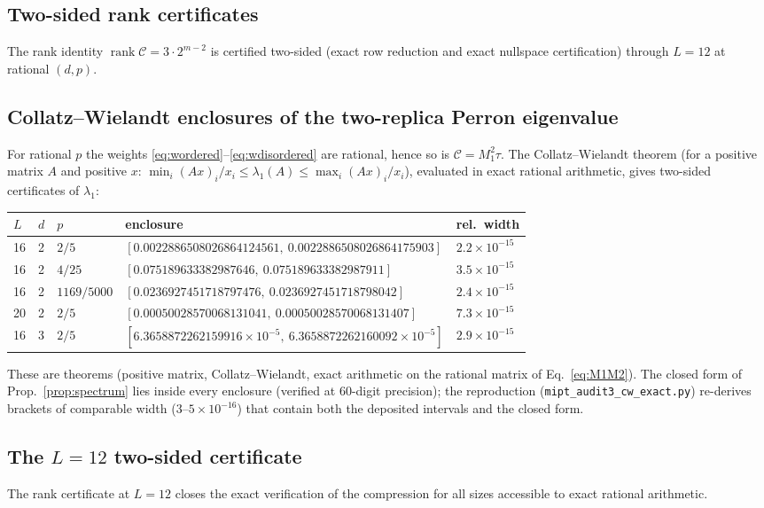 \documentclass[11pt]{article}
\newcommand{\Ccomp}{\mathcal{C}}
\begin{document}
\subsection{Two-sided rank certificates}
\label{app:certificates}
The rank identity $\operatorname{rank}\Ccomp=3\cdot2^{m-2}$ is certified
two-sided (exact row reduction and exact nullspace certification) through
$L=12$ at rational $(d,p)$.

\subsection{Collatz--Wielandt enclosures of the two-replica Perron
eigenvalue}\label{app:enclosures}
For rational $p$ the weights \eqref{eq:wordered}--\eqref{eq:wdisordered} are
rational, hence so is $\Ccomp=M_1^2\tau$.  The Collatz--Wielandt theorem
(for a positive matrix $A$ and positive $x$:
$\min_i(Ax)_i/x_i\le\lambda_1(A)\le\max_i(Ax)_i/x_i$), evaluated in exact
rational arithmetic, gives two-sided certificates of $\lambda_1$:
\begin{center}
\begin{tabular}{lllll}
\toprule
$L$ & $d$ & $p$ & enclosure & rel.\ width\\
\midrule
16 & 2 & $2/5$       & $[0.0022886508026864124561,\ 0.0022886508026864175903]$ & $2.2\times10^{-15}$\\
16 & 2 & $4/25$      & $[0.075189633382987646,\    0.075189633382987911]$     & $3.5\times10^{-15}$\\
16 & 2 & $1169/5000$ & $[0.0236927451718797476,\   0.0236927451718798042]$    & $2.4\times10^{-15}$\\
20 & 2 & $2/5$       & $[0.00050028570068131041,\  0.00050028570068131407]$    & $7.3\times10^{-15}$\\
16 & 3 & $2/5$       & $[6.3658872262159916{\times}10^{-5},\ 6.3658872262160092{\times}10^{-5}]$ & $2.9\times10^{-15}$\\
\bottomrule
\end{tabular}
\end{center}
These are theorems (positive matrix, Collatz--Wielandt, exact arithmetic on
the rational matrix of Eq.~\eqref{eq:M1M2}).  The closed form of
Prop.~\ref{prop:spectrum} lies inside every enclosure (verified at
$60$-digit precision); the reproduction
(\texttt{mipt\_audit3\_cw\_exact.py}) re-derives brackets of comparable
width ($3$--$5\times10^{-16}$) that contain both the deposited intervals and
the closed form.

\subsection{The $L=12$ two-sided certificate}\label{app:L12}
The rank certificate at $L=12$ closes the exact verification of the
compression for all sizes accessible to exact rational arithmetic.
\end{document}
